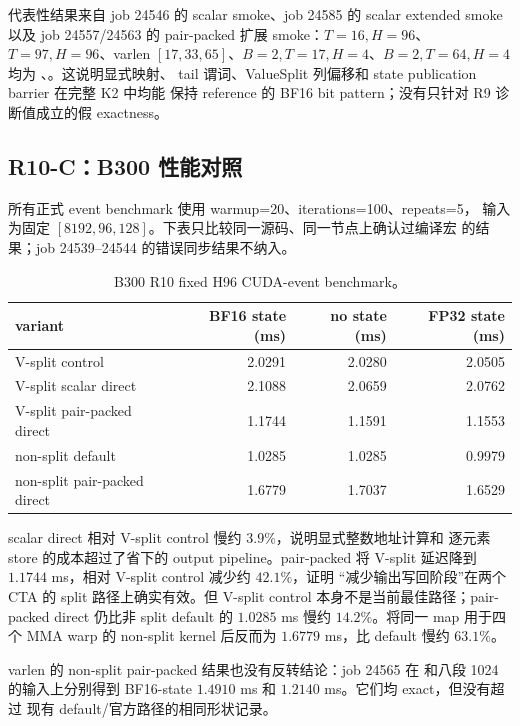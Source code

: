代表性结果来自 job 24546 的 scalar smoke、job 24585 的 scalar extended smoke
以及 job 24557/24563 的 pair-packed 扩展 smoke：\(T=16,H=96\)、\(T=97,H=96\)、varlen
\([17,33,65]\)、\(B=2,T=17,H=4\)、\(B=2,T=64,H=4\) 均为
、。这说明显式映射、
tail 谓词、ValueSplit 列偏移和 state publication barrier 在完整 K2 中均能
保持 reference 的 BF16 bit pattern；没有只针对 R9 诊断值成立的假 exactness。

\subsection{R10-C：B300 性能对照}

所有正式 event benchmark 使用 warmup=20、iterations=100、repeats=5，
输入为固定 \([8192,96,128]\)。下表只比较同一源码、同一节点上确认过编译宏
的结果；job 24539--24544 的错误同步结果不纳入。

\begin{table}[htbp]
\centering
\small
\begin{tabular}{l r r r}
\toprule
variant & BF16 state (ms) & no state (ms) & FP32 state (ms) \\
\midrule
V-split control & 2.0291 & 2.0280 & 2.0505 \\
V-split scalar direct & 2.1088 & 2.0659 & 2.0762 \\
V-split pair-packed direct & 1.1744 & 1.1591 & 1.1553 \\
non-split default & 1.0285 & 1.0285 & 0.9979 \\
non-split pair-packed direct & 1.6779 & 1.7037 & 1.6529 \\
\bottomrule
\end{tabular}
\caption{B300 R10 fixed H96 CUDA-event benchmark。}
\end{table}

scalar direct 相对 V-split control 慢约 \(3.9\%\)，说明显式整数地址计算和
逐元素 store 的成本超过了省下的 output pipeline。pair-packed 将 V-split
延迟降到 \(1.1744\) ms，相对 V-split control 减少约 \(42.1\%\)，证明
“减少输出写回阶段”在两个 CTA 的 split 路径上确实有效。但 V-split control
本身不是当前最佳路径；pair-packed direct 仍比非 split default 的
\(1.0285\) ms 慢约 \(14.2\%\)。将同一 map 用于四个 MMA warp 的 non-split
kernel 后反而为 \(1.6779\) ms，比 default 慢约 \(63.1\%\)。

varlen 的 non-split pair-packed 结果也没有反转结论：job 24565 在
\code{[1300,547,2048,963,271,3063]} 和八段 1024 的输入上分别得到
BF16-state \(1.4910\) ms 和 \(1.2140\) ms。它们均 exact，但没有超过
现有 default/官方路径的相同形状记录。

